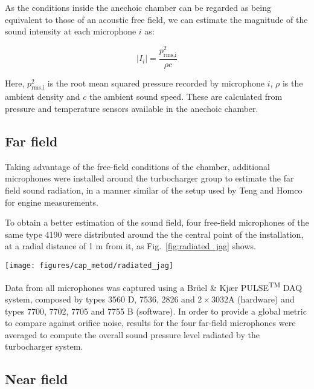 As the conditions inside the anechoic chamber can be regarded as being equivalent to those of an acoustic free field, we can estimate the magnitude of the sound intensity at each microphone $i$ as:

\begin{equation}
	|I_i| = \frac{p^2_\text{rms,i}}{\rho c}
\end{equation}

Here, $p^2_\text{rms,i}$ is the root mean squared pressure recorded by microphone $i$, $\rho$ is the ambient density and $c$ the ambient sound speed. These are calculated from pressure and temperature sensors available in the anechoic chamber.

\subsection{Far field}
\label{sub:metod_far_field}

Taking advantage of the free-field conditions of the chamber, additional microphones were installed around the turbocharger group to estimate the far field sound radiation, in a manner similar of the setup used by Teng and Homco \cite{teng2009investigation} for engine measurements.

To obtain a better estimation of the sound field, four free-field microphones of the same type 4190 were distributed around the the central point of the installation, at a radial distance of 1 m from it, as Fig.~\ref{fig:radiated_jag} shows.

\begin{figure*}[tb!]
\centering
\texttt{[image: figures/cap\_metod/radiated\_jag]}
\caption{Radiated noise microphones installed around a commercial set of compressor inlet and outlet pipes that will be sequentially insulated.}
\label{fig:radiated_jag}
\end{figure*}

Data from all microphones was captured using a Brüel \& Kjær PULSE\textsuperscript{TM} DAQ system, composed by types 3560 D, 7536, 2826 and $2\times 3032$A (hardware) and types 7700, 7702, 7705 and 7755 B (software). In order to provide a global metric to compare against orifice noise, results for the four far-field microphones were averaged to compute the overall sound pressure level radiated by the turbocharger system.

\subsection{Near field} %

